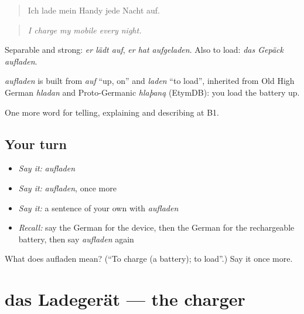 \begin{quote}
Ich lade mein Handy jede Nacht auf.
\end{quote}

\begin{quote}
\emph{I charge my mobile every night.}
\end{quote}

Separable and strong: \emph{er lädt auf}, \emph{er hat aufgeladen}. Also to load: \emph{das Gepäck aufladen}.

\begin{cousinweb}
\emph{aufladen} is built from \emph{auf} \textquotedblleft{}up, on\textquotedblright{} and \emph{laden} \textquotedblleft{}to load\textquotedblright{}, inherited from Old High German \emph{hladan} and Proto-Germanic \emph{hlaþaną} (EtymDB): you load the battery up.
\end{cousinweb}

\begin{grammarlens}[title={What you've built}]
One more word for telling, explaining and describing at B1.
\end{grammarlens}

\subsection*{Your turn}
\begin{itemize}
\raggedright
  \item \emph{Say it:} \emph{aufladen}
  \item \emph{Say it:} \emph{aufladen}, once more
  \item \emph{Say it:} a sentence of your own with \emph{aufladen}
  \item \emph{Recall:} say the German for the device, then the German for the rechargeable battery, then say \emph{aufladen} again
\end{itemize}

\begin{tcolorbox}[breakable,colback=teal!4,colframe=teal!35!black,title={Before you move on}]
What does aufladen mean? (\textquotedblleft{}To charge (a battery); to load\textquotedblright{}.) Say it once more.
\end{tcolorbox}
\section[das Ladegerät]{das Ladegerät — the charger}

\label{lesson:GE-C392-ladegeraet}



